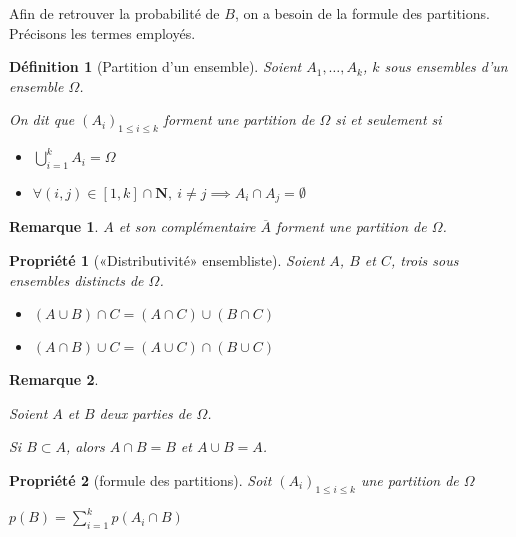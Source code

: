 \documentclass[12pt,a4paper]{article}
\newcommand{\N}{\mathbf{N}}
\theoremstyle{break}
\newtheorem{definition}{Définition}
\newtheorem{propriete}{Propriété}
\theoremstyle{plain}
\theoremstyle{nonumberplain}
\newtheorem{remarque}{Remarque}
\theoremstyle{nonumberbreak}
\begin{document}
Afin de retrouver la probabilité de $B$, on a besoin de la formule des
partitions. Précisons les termes employés.

\begin{definition}[Partition d'un ensemble]
  Soient $A_1,\dots,A_k$, $k$ sous ensembles d'un ensemble $\Omega$.

  On dit que $(A_i)_{1\leq i\leq k}$ forment une \emph{partition} de
  $\Omega$ si et seulement si
  \begin{itemize}
    \item $\bigcup_{i=1}^k A_i = \Omega$
    \item $\forall (i,j) \in [1,k]\cap\N,\  i\neq j \implies A_i\cap
      A_j = \emptyset$
  \end{itemize}
\end{definition}

\begin{remarque} $A$ et son complémentaire $\overline{A}$ forment une
  partition de $\Omega$.
\end{remarque}

\begin{propriete}[«Distributivité» ensembliste]
  Soient $A$, $B$ et $C$, trois sous ensembles distincts de $\Omega$.

  \begin{itemize}
    \item $(A \cup B) \cap C = (A\cap C) \cup (B\cap C)$
    \item $(A \cap B) \cup C = (A \cup C) \cap (B \cup C)$
  \end{itemize}
\end{propriete}


\begin{remarque}~

  Soient $A$ et $B$ deux parties de $\Omega$.

  Si $B \subset A$, alors $A\cap B = B$ et $A\cup B= A$.
\end{remarque}

\begin{propriete}[formule des partitions]
  Soit $(A_i)_{1\leq i\leq k}$ une partition de $\Omega$

  $p(B) = \sum_{i=1}^k p(A_i \cap B)$
\end{propriete}
\end{document}
